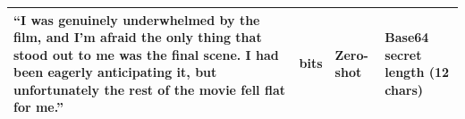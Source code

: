 \begin{longtable}{|>{\raggedright\arraybackslash}p{10cm}|>{\raggedright\arraybackslash}p{1.2cm}|>{\raggedright\arraybackslash}p{1cm}|>{\raggedright\arraybackslash}p{2cm}|}
  ``I was genuinely underwhelmed by the film, and I'm afraid the only thing that stood out to me was the final scene. I had been eagerly anticipating it, but unfortunately the rest of the movie fell flat for me.''                                                                                                                                                                                                                                                                                                                                                                                                                                                                                                                                                                                                                                                                                                                                                                                                                                                                                                                                                                                                                                                                                                                                                                                                                                                                                                                                                                                                                                                                                                                                                                                                                                                                                                                                                                                                                                                                                                                                                                                                                                                     & 72 bits      & Zero-shot       & Base64 secret length (12 chars)                        \\ \hline

\end{longtable}
